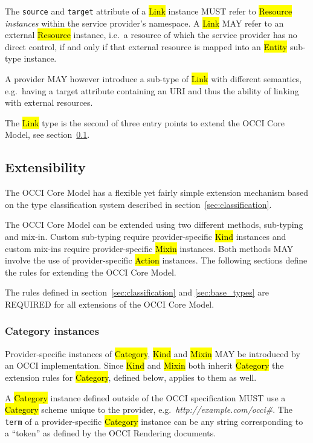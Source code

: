 \documentclass[10pt,a4paper]{article}
\begin{document}
The {\tt source} and {\tt target} attribute of a \hl{Link} instance
MUST refer to \hl{Resource} {\em instances} within the service provider's
namespace. A \hl{Link} MAY refer to an external \hl{Resource} instance, i.e.~a
resource of which the service provider has no direct control, if and
only if that external resource is mapped into an \hl{Entity} sub-type
instance.

A provider MAY however introduce a sub-type of \hl{Link} with
different semantics, e.g.~having a target attribute containing an URI
and thus the ability of linking with external resources.

The \hl{Link} type is the second of three entry points to extend the
OCCI Core Model, see section~\ref{sec:extensibility}.


\subsection{Extensibility}
\label{sec:extensibility}
The OCCI Core Model has a flexible yet fairly simple extension
mechanism based on the type classification system described in
section~\ref{sec:classification}.

The OCCI Core Model can be extended using two different methods,
sub-typing and mix-in. Custom sub-typing require provider-specific
\hl{Kind} instances and custom mix-ins require provider-specific
\hl{Mixin} instances.  Both methods MAY involve the use of
provider-specific \hl{Action} instances.
The following sections
define the rules for extending the OCCI Core Model.

The rules defined in section~\ref{sec:classification} and
\ref{sec:base_types} are REQUIRED for all extensions of the OCCI Core
Model.

\subsubsection{Category instances}
\label{sec:ext:category}
Provider-specific instances of \hl{Category}, \hl{Kind} and \hl{Mixin}
MAY be introduced by an OCCI implementation. Since \hl{Kind} and
\hl{Mixin} both inherit \hl{Category} the extension rules for
\hl{Category}, defined below, applies to them as well.

A \hl{Category} instance defined outside of the OCCI specification
MUST use a \hl{Category} scheme unique to the provider,
e.g.~\textit{http://example.com/occi\#}. The {\tt term} of a
provider-specific \hl{Category} instance can be any string
corresponding to a ``token'' as defined by the OCCI Rendering documents.
\end{document}
